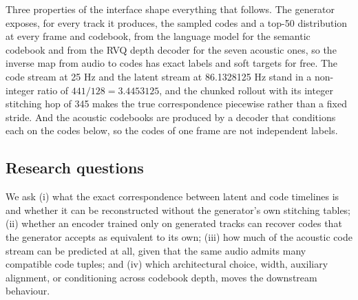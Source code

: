 Three properties of the interface shape everything that follows. The generator exposes, for every track it produces, the sampled codes and a top-50 distribution at every frame and codebook, from the language model for the semantic codebook and from the RVQ depth decoder for the seven acoustic ones, so the inverse map from audio to codes has exact labels and soft targets for free. The code stream at 25 Hz and the latent stream at 86.1328125 Hz stand in a non-integer ratio of $441/128 = 3.4453125$, and the chunked rollout with its integer stitching hop of 345 makes the true correspondence piecewise rather than a fixed stride. And the acoustic codebooks are produced by a decoder that conditions each on the codes below, so the codes of one frame are not independent labels.

\subsection{Research questions}

We ask (i) what the exact correspondence between latent and code timelines is and whether it can be reconstructed without the generator's own stitching tables; (ii) whether an encoder trained only on generated tracks can recover codes that the generator accepts as equivalent to its own; (iii) how much of the acoustic code stream can be predicted at all, given that the same audio admits many compatible code tuples; and (iv) which architectural choice, width, auxiliary alignment, or conditioning across codebook depth, moves the downstream behaviour.
